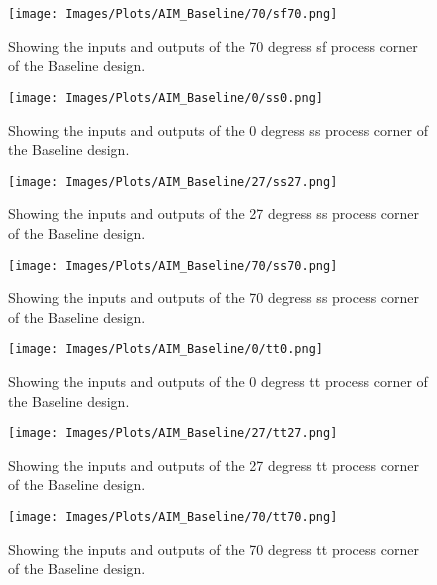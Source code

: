 \begin{figure}[htb] 
    \centering
    \texttt{[image: Images/Plots/AIM\_Baseline/70/sf70.png]} 
    \caption{Showing the inputs and outputs of the 70 degress sf process corner of the Baseline design.} 
    \label{fig:70sfBaseline} 
\end{figure}
\newline
\begin{figure}[htb] 
    \centering
    \texttt{[image: Images/Plots/AIM\_Baseline/0/ss0.png]} 
    \caption{Showing the inputs and outputs of the 0 degress ss process corner of the Baseline design.} 
    \label{fig:0ssBaseline} 
\end{figure}
\begin{figure}[htb] 
    \centering
    \texttt{[image: Images/Plots/AIM\_Baseline/27/ss27.png]} 
    \caption{Showing the inputs and outputs of the 27 degress ss process corner of the Baseline design.} 
    \label{fig:27ssBaseline} 
\end{figure}
\newline
\begin{figure}[htb] 
    \centering
    \texttt{[image: Images/Plots/AIM\_Baseline/70/ss70.png]} 
    \caption{Showing the inputs and outputs of the 70 degress ss process corner of the Baseline design.} 
    \label{fig:70ssBaseline} 
\end{figure}
\begin{figure}[htb] 
    \centering
    \texttt{[image: Images/Plots/AIM\_Baseline/0/tt0.png]} 
    \caption{Showing the inputs and outputs of the 0 degress tt process corner of the Baseline design.} 
    \label{fig:0ttBaseline} 
\end{figure}
\newline
\begin{figure}[htb] 
    \centering
    \texttt{[image: Images/Plots/AIM\_Baseline/27/tt27.png]} 
    \caption{Showing the inputs and outputs of the 27 degress tt process corner of the Baseline design.} 
    \label{fig:27ttBaseline} 
\end{figure}
\begin{figure}[htb] 
    \centering
    \texttt{[image: Images/Plots/AIM\_Baseline/70/tt70.png]} 
    \caption{Showing the inputs and outputs of the 70 degress tt process corner of the Baseline design.} 
    \label{fig:70ttBaseline} 
\end{figure}
\newline
